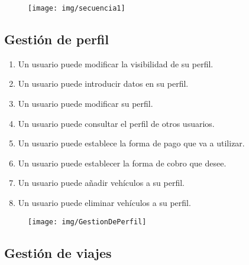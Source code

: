 		\begin{figure}[H]
			\centering
			\texttt{[image: img/secuencia1]}
			\label{fig:secuencia1}
		\end{figure}

		\subsection{Gestión de perfil}
		
		\begin{enumerate}
			\item Un usuario puede modificar la visibilidad de su perfil.
			\item Un usuario puede introducir datos en su perfil.
			\item Un usuario puede modificar su perfil.
			\item Un usuario puede consultar el perfil de otros usuarios.
			\item Un usuario puede establece la forma de pago que va a utilizar.
			\item Un usuario puede establecer la forma de cobro que desee.
			\item Un usuario puede añadir vehículos a su perfil.
			\item Un usuario puede eliminar vehículos a su perfil.
		\end{enumerate}	
		
		\begin{figure}[H]
			\centering
			\texttt{[image: img/GestionDePerfil]}
			\label{fig:gestiondeperfil}
		\end{figure}

		
		\subsection{Gestión de viajes}
		
